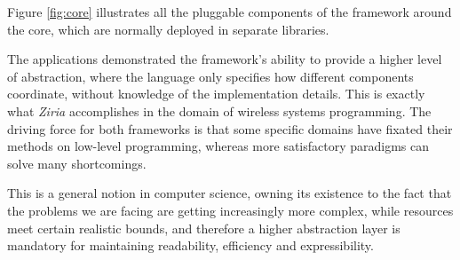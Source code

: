 \documentclass[sigplan,review,anonymous]{acmart}
\begin{document}
Figure \ref{fig:core} illustrates all the pluggable components of the framework
around the core, which are normally deployed in separate libraries.


The applications demonstrated the framework's ability to provide a higher level
of abstraction, where the language only specifies how different components
coordinate, without knowledge of the implementation details. This is exactly
what \textit{Ziria} accomplishes in the domain of wireless systems
programming\cite{ziria}. The driving force for both frameworks is that some
specific domains have fixated their methods on low-level programming, whereas
more satisfactory paradigms can solve many shortcomings.

This is a general notion in computer science, owning its existence to the fact
that the problems we are facing are getting increasingly more complex, while
resources meet certain realistic bounds, and therefore a higher abstraction
layer is mandatory for maintaining readability, efficiency and expressibility.



\end{document}
